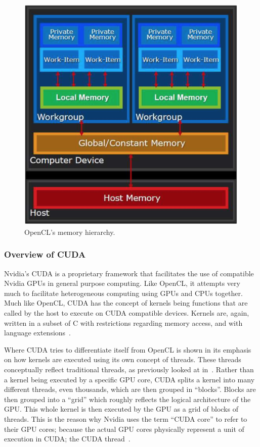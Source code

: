 \documentclass[a4paper,11pt]{article}
\begin{document}
\begin{figure}[ht]
  \centering
  \includegraphics[scale=0.5]{img/opencl-mem-model}
  \caption{OpenCL's memory hierarchy.~\cite{slides:KhronosOpenCLOverview}}
\label{fig:opencl-mem-model}
\end{figure}

\subsubsection{Overview of CUDA} %
\label{ssub:overview_of_cuda}
Nvidia's CUDA is a proprietary framework that facilitates the use of compatible Nvidia GPUs in general purpose computing.
Like OpenCL, it attempts very much to facilitate heterogeneous computing using GPUs and CPUs together. Much like OpenCL,
CUDA has the concept of kernels being functions that are called by the host to execute on CUDA compatible devices. Kernels
are, again, written in a subset of C with restrictions regarding memory access, and with language extensions~\cite{slides:CUDAOverview}.

Where CUDA tries to differentiate itself from OpenCL is shown in its emphasis on how kernels are executed using its own
concept of threads. These threads conceptually reflect traditional threads, as previously looked at in~.
Rather than a kernel being executed by a specific GPU core, CUDA splits a kernel into many different threads, even thousands,
which are then grouped in ``blocks''. Blocks are then grouped into a ``grid'' which roughly reflects the logical architecture
of the GPU. This whole kernel is then executed by the GPU as a grid of blocks of threads. This is the reason why Nvidia
uses the term ``CUDA core'' to refer to their GPU cores; because the actual GPU cores physically represent a unit of
execution in CUDA; the CUDA thread~\cite{slides:CUDAOverview}.
\end{document}

